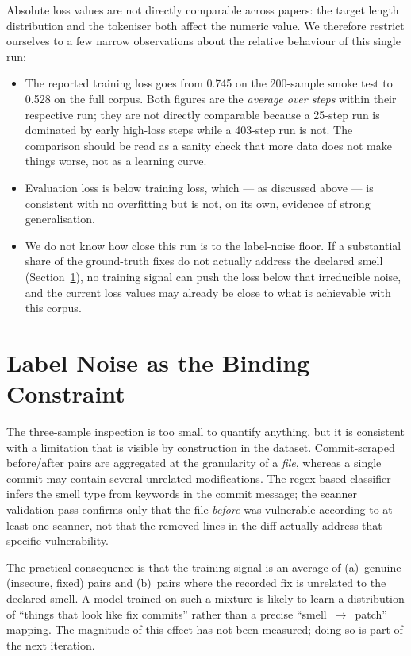 \documentclass[12pt, a4paper]{report}
\begin{document}
Absolute loss values are not directly comparable across papers: the
target length distribution and the tokeniser both affect the numeric
value. We therefore restrict ourselves to a few narrow observations
about the relative behaviour of this single run:

\begin{itemize}
  \item The reported training loss goes from 0.745 on the 200-sample
        smoke test to 0.528 on the full corpus. Both figures are the
        \emph{average over steps} within their respective run; they are
        not directly comparable because a 25-step run is dominated by
        early high-loss steps while a 403-step run is not. The
        comparison should be read as a sanity check that more data does
        not make things worse, not as a learning curve.
  \item Evaluation loss is below training loss, which --- as discussed
        above --- is consistent with no overfitting but is not, on its
        own, evidence of strong generalisation.
  \item We do not know how close this run is to the label-noise floor.
        If a substantial share of the ground-truth fixes do not
        actually address the declared smell (Section~\ref{sec:label-noise}),
        no training signal can push the loss below that irreducible
        noise, and the current loss values may already be close to what
        is achievable with this corpus.
\end{itemize}

\section{Label Noise as the Binding Constraint}
\label{sec:label-noise}

The three-sample inspection is too small to quantify anything, but it
is consistent with a limitation that is visible by construction in the
dataset. Commit-scraped before/after pairs are aggregated at the
granularity of a \emph{file}, whereas a single commit may contain
several unrelated modifications. The regex-based classifier infers the
smell type from keywords in the commit message; the scanner validation
pass confirms only that the file \emph{before} was vulnerable according
to at least one scanner, not that the removed lines in the diff actually
address that specific vulnerability.

The practical consequence is that the training signal is an average of
(a)~genuine (insecure, fixed) pairs and (b)~pairs where the recorded
fix is unrelated to the declared smell. A model trained on such a
mixture is likely to learn a distribution of ``things that look like
fix commits'' rather than a precise ``smell~$\to$~patch'' mapping.
The magnitude of this effect has not been measured; doing so is part of
the next iteration.
\end{document}
